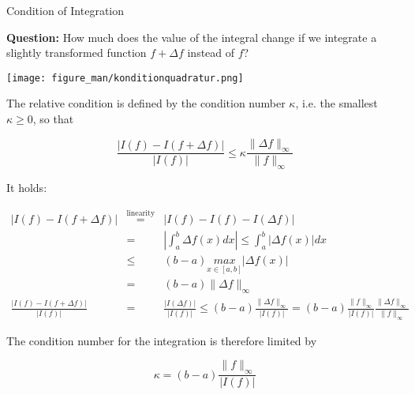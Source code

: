\documentclass[11pt,compress,t,notes=noshow, xcolor=table]{beamer}
\begin{document}
\begin{vbframe}{Condition of Integration}

\textbf{Question:} How much does the value of the integral change if we integrate a slightly transformed function $f + \Delta f$ instead of $f$?

\vspace*{-0.2cm}
\begin{center}
\texttt{[image: figure\_man/konditionquadratur.png]}
\end{center}

\framebreak

The relative condition is defined by the condition number $\kappa$, i.e. the smallest $\kappa \ge 0$, so that

$$
\frac{|I(f) - I(f + \Delta f)|}{|I(f)|} \le \kappa \frac{\|\Delta f\|_\infty}{\|f\|_\infty}
$$

It holds:

\vspace*{-0.5cm}
{\footnotesize
\begin{eqnarray*}
|I(f) - I(f + \Delta f)| &\overset{\text{linearity}}{=}& |I(f) - I(f) - I(\Delta f)| \\
  &=& \left| \int_a^b \Delta f(x)dx \right| \leq \int_a^b |\Delta f(x)|dx \\
  &\leq& (b - a) \underset{x \in [a, b]}{max}|\Delta f(x)| \\
  &=& (b - a) \| \Delta f \|_{\infty} \\[0.3cm]
\frac{|I(f) - I(f + \Delta f)|}{|I(f)|} &=& \frac{|I(\Delta f)|}{|I(f)|} \le (b - a) \frac{\|\Delta f\|_\infty}{|I(f)|} = (b - a) \frac{\|f\|_\infty}{|I(f)|} \frac{\|\Delta f\|_\infty}{\|f\|_\infty}
\end{eqnarray*}
}

\framebreak

The condition number for the integration is therefore limited by

\vspace*{-0.2cm}
$$
\kappa = (b - a) \frac{\|f\|_\infty}{|I(f)|}
$$


\end{vbframe}
\end{document}
